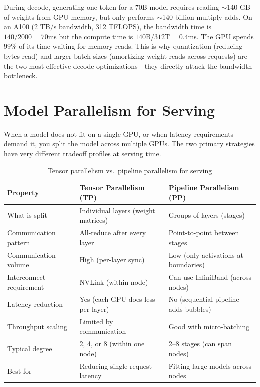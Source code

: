 \begin{keyinsight}
During decode, generating one token for a 70B model requires reading $\sim$140 GB of weights from GPU memory, but only performs $\sim$140 billion multiply-adds. On an A100 (2 TB/s bandwidth, 312 TFLOPS), the bandwidth time is $140/2000 = 70$ms but the compute time is $140\text{B}/312\text{T} = 0.4$ms. The GPU spends 99\% of its time waiting for memory reads. This is why quantization (reducing bytes read) and larger batch sizes (amortizing weight reads across requests) are the two most effective decode optimizations---they directly attack the bandwidth bottleneck.
\end{keyinsight}

\section{Model Parallelism for Serving}
\label{sec:serving_parallelism}

When a model does not fit on a single GPU, or when latency requirements demand it, you split the model across multiple GPUs. The two primary strategies have very different tradeoff profiles at serving time.

\begin{table}[H]
\centering
\caption{Tensor parallelism vs.\ pipeline parallelism for serving}
\begin{tabularx}{\textwidth}{lXX}
\toprule
\textbf{Property} & \textbf{Tensor Parallelism (TP)} & \textbf{Pipeline Parallelism (PP)} \\
\midrule
What is split & Individual layers (weight matrices) & Groups of layers (stages) \\
Communication pattern & All-reduce after every layer & Point-to-point between stages \\
Communication volume & High (per-layer sync) & Low (only activations at boundaries) \\
Interconnect requirement & NVLink (within node) & Can use InfiniBand (across nodes) \\
Latency reduction & Yes (each GPU does less per layer) & No (sequential pipeline adds bubbles) \\
Throughput scaling & Limited by communication & Good with micro-batching \\
Typical degree & 2, 4, or 8 (within one node) & 2--8 stages (can span nodes) \\
Best for & Reducing single-request latency & Fitting large models across nodes \\
\bottomrule
\end{tabularx}
\end{table}

